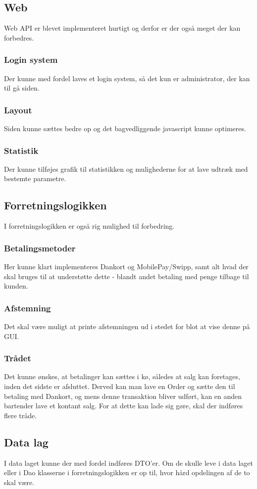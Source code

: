 \subsection{Web}
Web \gls{API} er blevet implementeret hurtigt og derfor er der også meget der kan forbedres.

\subsubsection{Login system}
Der kunne med fordel laves et login system, så det kun er administrator, der kan til gå siden.

\subsubsection{Layout}
Siden kunne sættes bedre op og det bagvedliggende javascript kunne optimeres.

\subsubsection{Statistik}
Der kunne tilføjes grafik til statistikken og mulighederne for at lave udtræk med bestemte parametre.

\subsection{Forretningslogikken}
I forretningslogikken er også rig mulighed til forbedring.

\subsubsection{Betalingsmetoder}
Her kunne klart implementeres Dankort og MobilePay/Swipp, samt alt hvad der skal bruges til at understøtte dette - blandt andet betaling med penge tilbage til kunden.

\subsubsection{Afstemning}
Det skal være muligt at printe afstemningen ud i stedet for blot at vise denne på \gls{GUI}.

\subsubsection{Trådet}
Det kunne ønskes, at betalinger kan sættes i kø, således at salg kan foretages, inden det sidste er afsluttet. Derved kan man lave en Order og sætte den til betaling med Dankort, og mens denne transaktion bliver udført, kan en anden bartender lave et kontant salg. For at dette kan lade sig gøre, skal der indføres flere tråde.

\subsection{Data lag}
I data laget kunne der med fordel indføres \gls{DTO}'er. Om de skulle leve i data laget eller i \gls{Dao} klasserne i forretningslogikken er op til, hvor hård opdelingen af de to skal være.